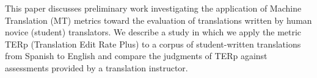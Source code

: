 This paper discusses preliminary work investigating the application of Machine Translation (MT) metrics toward the evaluation of translations written by human
 novice (student) translators.  We describe a study in which we apply the metric
 TERp (Translation Edit Rate Plus) to a corpus of student-written translations
 from Spanish to English and compare the judgments of TERp against assessments
 provided by a translation instructor.

